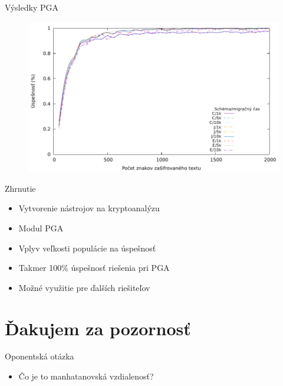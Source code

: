 \documentclass{beamer}
\begin{document}
\begin{frame}{Výsledky PGA}
  \begin{figure}
    \includegraphics[scale=0.75]{img/PGA.pdf}
  \end{figure}  
\end{frame}

\begin{frame}{Zhrnutie}
  \begin{itemize}
  \item Vytvorenie nástrojov na kryptoanalýzu
  \item Modul PGA
  \item Vplyv veľkosti populácie na úspešnosť
  \item Takmer 100\% úspešnosť riešenia pri PGA
  \item Možné využitie pre ďalších riešiteľov
  \end{itemize}
\end{frame}

\section{Ďakujem za pozornosť}

\begin{frame}{Oponentská otázka}
  \begin{itemize}
  \item Čo je to manhatanovská vzdialenosť?
  \end{itemize}
\end{frame}
\end{document}
